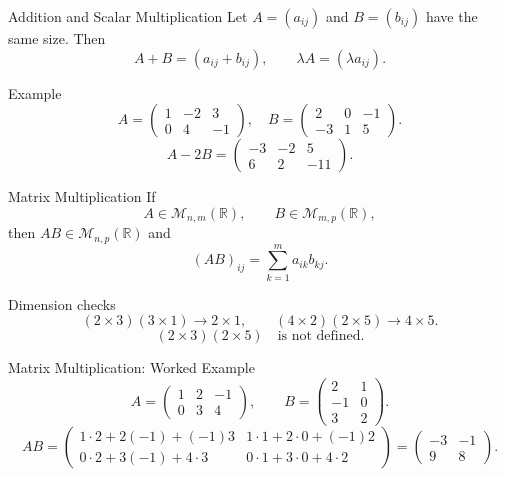 \documentclass[aspectratio=169]{beamer}
\newcommand{\R}{\mathbb{R}}
\newcommand{\M}{\mathcal{M}}
\begin{document}
\begin{frame}{Addition and Scalar Multiplication}
Let $A=(a_{ij})$ and $B=(b_{ij})$ have the same size. Then
\[
A+B=(a_{ij}+b_{ij}),\qquad
\lambda A=(\lambda a_{ij}).
\]
\pause
\begin{exampleblock}{Example}
\[
A=\begin{pmatrix}1&-2&3\\0&4&-1\end{pmatrix},
\quad
B=\begin{pmatrix}2&0&-1\\-3&1&5\end{pmatrix}.
\]
\[
A-2B=
\begin{pmatrix}
-3&-2&5\\
6&2&-11
\end{pmatrix}.
\]
\end{exampleblock}
\end{frame}

\begin{frame}{Matrix Multiplication}
If
\[
A\in \M_{n,m}(\R),\qquad B\in \M_{m,p}(\R),
\]
then $AB\in \M_{n,p}(\R)$ and
\[
(AB)_{ij}=\sum_{k=1}^m a_{ik}b_{kj}.
\]
\pause
\begin{block}{Dimension checks}
\[
(2\times 3)(3\times 1)\to 2\times 1,\qquad
(4\times 2)(2\times 5)\to 4\times 5.
\]
\[
(2\times 3)(2\times 5)\quad\text{is not defined.}
\]
\end{block}
\end{frame}

\begin{frame}{Matrix Multiplication: Worked Example}
\[
A=\begin{pmatrix}
1&2&-1\\
0&3&4
\end{pmatrix},
\qquad
B=\begin{pmatrix}
2&1\\
-1&0\\
3&2
\end{pmatrix}.
\]
\pause
\[
AB=
\begin{pmatrix}
1\cdot2+2(-1)+(-1)3 & 1\cdot1+2\cdot0+(-1)2\\
0\cdot2+3(-1)+4\cdot3 & 0\cdot1+3\cdot0+4\cdot2
\end{pmatrix}
=
\begin{pmatrix}-3&-1\\9&8\end{pmatrix}.
\]
\end{frame}
\end{document}
